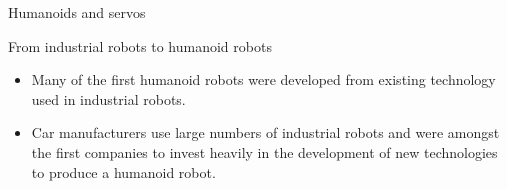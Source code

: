\documentclass[compress]{beamer}
\begin{document}
\begin{frame}{Humanoids and servos}

    From industrial robots to humanoid robots

    \begin{itemize}

        \item Many of the first humanoid robots were developed from existing
            technology used in industrial robots.
        \item Car manufacturers use large numbers of industrial robots and were
            amongst the first companies to invest heavily in the development of
            new technologies to produce a humanoid robot.
    \end{itemize}

\end{frame}
\end{document}
